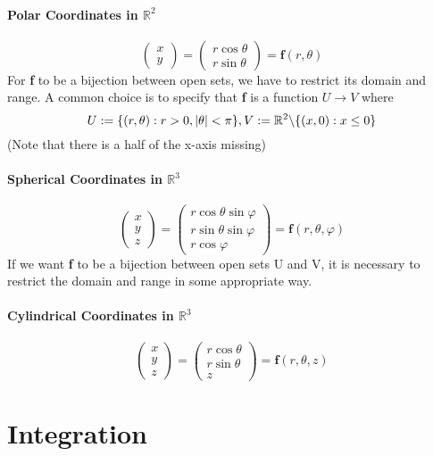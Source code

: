 \documentclass[11pt]{article}
\newcommand{\tb}[1]{\textbf{#1}}
\newcommand{\real}[0]{\mathbb{R}}
\begin{document}
\paragraph{Polar Coordinates in $\real^2$}
$$\begin{pmatrix}
    x\\y
\end{pmatrix}
= \begin{pmatrix}
    r\cos{\theta}\\
    r\sin{\theta}
\end{pmatrix}
= \tb{f}(r, \theta) $$
For \tb{f} to be a bijection between open sets, we have to restrict its domain and range. A common choice is to specify that \tb{f} is a function $U \rightarrow V$ where
$$U := \{(r, \theta): r > 0, |\theta| < \pi\},   V:= \real^2 \symbol{92}\{(x, 0): x \leq 0 \}$$
(Note that there is a half of the x-axis missing)
\paragraph{Spherical Coordinates in $\real^3$}
$$\begin{pmatrix}
    x\\y\\z
\end{pmatrix}
= \begin{pmatrix}
    r\cos{\theta}\sin{\varphi}\\
    r\sin{\theta}\sin{\varphi}\\
    r\cos{\varphi}
\end{pmatrix}
= \tb{f}(r, \theta, \varphi)$$
If we want \tb{f} to be a bijection between open sets U and V, it is necessary to restrict the domain and range in some appropriate way.

\paragraph{Cylindrical Coordinates in $\real^3$}
$$\begin{pmatrix}
    x\\y\\z
\end{pmatrix}
= \begin{pmatrix}
    r\cos{\theta}\\
    r\sin{\theta}\\
    z
\end{pmatrix}
= \tb{f}(r, \theta, z)$$

\section{Integration}
\end{document}
